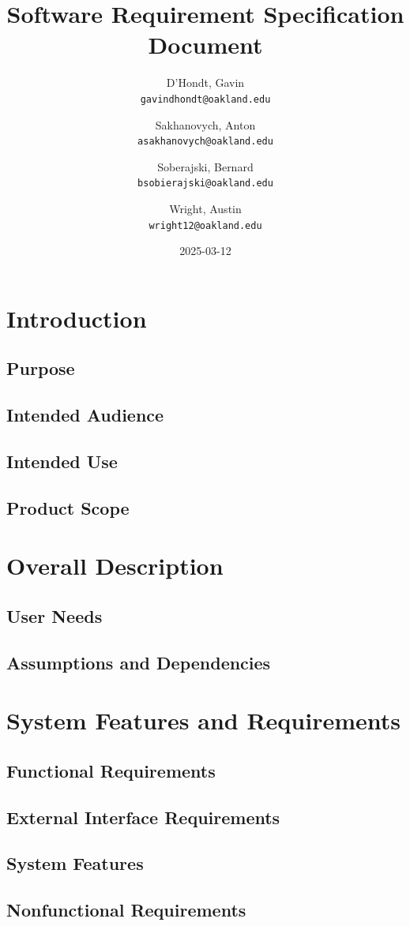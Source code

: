\documentclass{article}
\title{Software Requirement Specification Document}
\date{2025-03-12}
\author{
  D'Hondt, Gavin\\
  \texttt{gavindhondt@oakland.edu}
  \and
  Sakhanovych, Anton\\
  \texttt{asakhanovych@oakland.edu}
  \and
  Soberajski, Bernard\\
  \texttt{bsobierajski@oakland.edu}
  \and
  Wright, Austin\\
  \texttt{wright12@oakland.edu}
}
\begin{document}
\maketitle
\newpage
\tableofcontents
\newpage
{}
\section{Introduction}
\subsection{Purpose}
\subsection{Intended Audience}
\subsection{Intended Use}
\subsection{Product Scope}
\newpage
\section{Overall Description}
\subsection{User Needs}
\subsection{Assumptions and Dependencies}
\newpage
\section{System Features and Requirements}
\subsection{Functional Requirements}
\subsection{External Interface Requirements}
\subsection{System Features}
\subsection{Nonfunctional Requirements}
\end{document}
